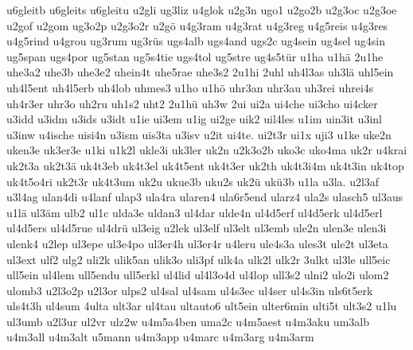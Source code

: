 {    u6gleitb
    u6gleits
    u6gleitu
    u2gli
    ug3liz
    u4glok
    u2g3n
    ugo1
    u2go2b
    u2g3oc
    u2g3oe
    u2gof
    u2gom
    ug3o2p
    u2g3o2r
    u2gö
    u4g3ram
    u4g3rat
    u4g3reg
    u4g5reis
    u4g3res
    u4g5rind
    u4grou
    ug3rum
    ug3rüs
    ugs4alb
    ugs4and
    ugs2c
    ug4sein
    ug4sel
    ug4sin
    ug5span
    ugs4por
    ug5stan
    ug5s4tie
    ugs4tol
    ug5stre
    ug4s5tür
    u1ha
    u1hä
    2u1he
    uhe3a2
    uhe3b
    uhe3e2
    uhein4t
    uhe5rae
    uhe3s2
    2u1hi
    2uhl
    uh4l3as
    uh3lä
    uhl5ein
    uh4l5ent
    uh4l5erb
    uh4lob
    uhmes3
    u1ho
    u1hö
    uhr3an
    uhr3au
    uh3rei
    uhrei4s
    uh4r3er
    uhr3o
    uh2ru
    uh1s2
    uht2
    2u1hü
    uh3w
    2ui
    ui2a
    ui4che
    ui3cho
    ui4cker
    u3idd
    u3idm
    u3ids
    u3idt
    u1ie
    ui3em
    u1ig
    ui2ge
    uik2
    uil4les
    u1im
    uin3it
    u3inl
    u3inw
    u4ische
    uisi4n
    u3ism
    uis3ta
    u3isv
    u2it
    ui4te.
    ui2t3r
    ui1x
    uji3
    u1ke
    uke2n
    uken3e
    uk3er3e
    u1ki
    u1k2l
    ukle3i
    uk3ler
    uk2n
    u2k3o2b
    uko3c
    uko4ma
    uk2r
    u4krai
    uk2t3a
    uk2t3ä
    uk4t3eb
    uk4t3el
    uk4t5ent
    uk4t3er
    uk2th
    uk4t3i4m
    uk4t3in
    uk4top
    uk4t5o4ri
    uk2t3r
    uk4t3um
    uk2u
    ukue3b
    uku2s
    uk2ü
    ukü3b
    u1la
    u3la.
    u2l3af
    u3l4ag
    ulan4di
    u4lanf
    ulap3
    ula4ra
    ularen4
    ula6r5end
    ularz4
    ula2s
    ulasch5
    ul3aus
    u1lä
    ul3äm
    ulb2
    ul1c
    ulda3e
    uldan3
    ul4dar
    ulde4n
    ul4d5erf
    ul4d5erk
    ul4d5erl
    ul4d5ers
    ul4d5rue
    ul4drü
    ul3eig
    u2lek
    ul3elf
    ul3elt
    ul3emb
    ule2n
    ulen3e
    ulen3i
    ulenk4
    u2lep
    ul3epe
    ul3e4po
    ul3er4h
    ul3er4r
    u4leru
    ule4s3a
    ules3t
    ule2t
    ul3eta
    ul3ext
    ulf2
    ulg2
    uli2k
    ulik5an
    ulik3o
    uli3pf
    ulk4a
    ulk2l
    ulk2r
    3ulkt
    ul3le
    ull5eic
    ull5ein
    ul4lem
    ull5endu
    ull5erkl
    ul4lid
    ul4l3o4d
    ul4lop
    ull3s2
    ulni2
    ulo2i
    ulom2
    ulomb3
    u2l3o2p
    u2l3or
    ulps2
    ul4sal
    ul4sam
    ul4s3ec
    ul4ser
    ul4s3in
    uls6t5erk
    uls4t3h
    ul4sum
    4ulta
    ult3ar
    ul4tau
    ultauto6
    ult5ein
    ulter6min
    ulti5t
    ult3s2
    u1lu
    ul3umb
    u2l3ur
    ul2vr
    ulz2w
    u4m5a4ben
    uma2c
    u4m5aest
    u4m3aku
    um3alb
    u4m3all
    u4m3alt
    u5mann
    u4m3app
    u4marc
    u4m3arg
    u4m3arm
}
